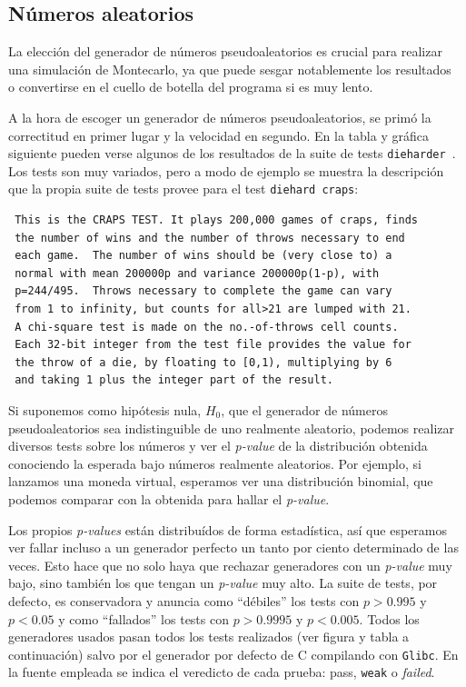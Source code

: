 \documentclass[11pt]{report}
\begin{document}
\begin{appendices}
\chapter{Números aleatorios}
\label{chap:random}





La elección del generador de números pseudoaleatorios es crucial para
realizar una simulación de Montecarlo, ya que puede sesgar
notablemente los resultados~\cite{randommonte}\cite{randomcoins} o
convertirse en el cuello de botella del programa si es muy lento.

A la hora de escoger un generador de números pseudoaleatorios, se primó la
correctitud en primer lugar y la velocidad en segundo. En la tabla
y gráfica siguiente pueden verse algunos de los resultados de la suite de tests
\verb|dieharder|~\cite{brown-2013}. Los tests son muy variados, pero a
modo de ejemplo se muestra la descripción que la propia suite de tests
provee para el test \verb|diehard craps|:

\begin{verbatim}
 This is the CRAPS TEST. It plays 200,000 games of craps, finds
 the number of wins and the number of throws necessary to end
 each game.  The number of wins should be (very close to) a
 normal with mean 200000p and variance 200000p(1-p), with
 p=244/495.  Throws necessary to complete the game can vary
 from 1 to infinity, but counts for all>21 are lumped with 21.
 A chi-square test is made on the no.-of-throws cell counts.
 Each 32-bit integer from the test file provides the value for
 the throw of a die, by floating to [0,1), multiplying by 6
 and taking 1 plus the integer part of the result.
\end{verbatim}

Si suponemos como hipótesis nula, $H_0$, que el generador de números
pseudoaleatorios sea indistinguible de uno realmente aleatorio,
podemos realizar diversos tests sobre los números y ver el
\textit{p-value} de la distribución obtenida conociendo la esperada
bajo números realmente aleatorios. Por ejemplo, si lanzamos una moneda
virtual, esperamos ver una distribución binomial, que podemos comparar
con la obtenida para hallar el \textit{p-value}.

Los propios \textit{p-values} están distribuídos de forma estadística,
así que esperamos ver fallar incluso a un generador perfecto un tanto
por ciento determinado de las veces. Esto hace que no solo haya que
rechazar generadores con un \textit{p-value} muy bajo, sino también
los que tengan un \textit{p-value} muy alto. La suite de tests, por
defecto, es conservadora y anuncia como ``débiles'' los tests con
$p>0.995$ y $p<0.05$ y como ``fallados'' los tests con
$p>0.9995$ y $p < 0.005$. Todos los generadores usados pasan todos los tests
realizados (ver figura y tabla a continuación) salvo por el generador
por defecto de C compilando con \verb~Glibc~.
En la fuente empleada se indica el veredicto de cada prueba:
\textcolor{PASSED}{pass}, \textcolor{WEAK}{\texttt{weak}} o
\textcolor{FAILED}{\textit{failed}}.


\end{appendices}
\end{document}
